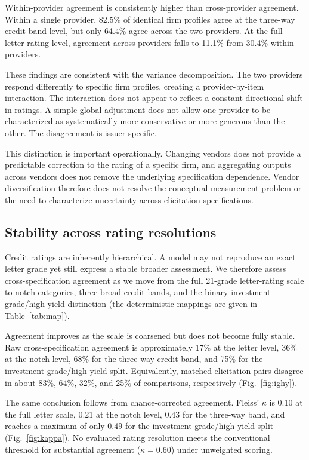 \documentclass[a4paper,fleqn]{cas-sc}
\begin{document}
Within-provider agreement is consistently higher than cross-provider agreement. Within a single provider,
82.5\% of identical firm profiles agree at the three-way credit-band level, but only 64.4\% agree across
the two providers. At the full letter-rating level, agreement across providers falls to 11.1\% from
30.4\% within providers.

These findings are consistent with the variance decomposition. The two providers respond differently to
specific firm profiles, creating a provider-by-item interaction. The interaction does not appear to
reflect a constant directional shift in ratings. A simple global adjustment does not allow one provider to
be characterized as systematically more conservative or more generous than the other. The disagreement is
issuer-specific.

This distinction is important operationally. Changing vendors does not provide a predictable correction
to the rating of a specific firm, and aggregating outputs across vendors does not remove the underlying
specification dependence. Vendor diversification therefore does not resolve the conceptual measurement
problem or the need to characterize uncertainty across elicitation specifications.

\subsection{Stability across rating resolutions}
Credit ratings are inherently hierarchical. A model may not reproduce an exact letter grade yet still
express a stable broader assessment. We therefore assess cross-specification agreement as we move from
the full 21-grade letter-rating scale to notch categories, three broad credit bands, and the binary
investment-grade/high-yield distinction (the deterministic mappings are given in Table~\ref{tab:map}).

Agreement improves as the scale is coarsened but does not become fully stable. Raw cross-specification
agreement is approximately 17\% at the letter level, 36\% at the notch level, 68\% for the three-way
credit band, and 75\% for the investment-grade/high-yield split. Equivalently, matched elicitation pairs
disagree in about 83\%, 64\%, 32\%, and 25\% of comparisons, respectively (Fig.~\ref{fig:ighy}).

The same conclusion follows from chance-corrected agreement. Fleiss' $\kappa$ is 0.10 at the full letter
scale, 0.21 at the notch level, 0.43 for the three-way band, and reaches a maximum of only 0.49 for the
investment-grade/high-yield split (Fig.~\ref{fig:kappa}). No evaluated rating resolution meets the
conventional threshold for substantial agreement ($\kappa=0.60$) under unweighted scoring.
\end{document}

